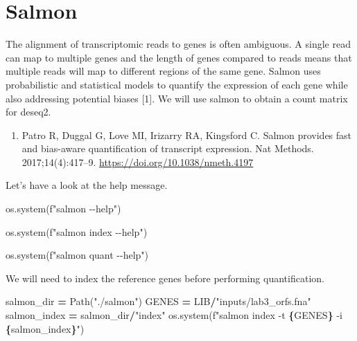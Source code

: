 \documentclass[
]{book}
\newenvironment{Shaded}{\begin{snugshade}}{\end{snugshade}}
\newcommand{\NormalTok}[1]{#1}
\newcommand{\OperatorTok}[1]{\textcolor[rgb]{0.81,0.36,0.00}{\textbf{#1}}}
\newcommand{\SpecialCharTok}[1]{\textcolor[rgb]{0.81,0.36,0.00}{\textbf{#1}}}
\newcommand{\SpecialStringTok}[1]{\textcolor[rgb]{0.31,0.60,0.02}{#1}}
\newcommand{\StringTok}[1]{\textcolor[rgb]{0.31,0.60,0.02}{#1}}
\providecommand{\tightlist}{%
  \setlength{\itemsep}{0pt}\setlength{\parskip}{0pt}}
\begin{document}
\section{Salmon}\label{salmon}

The alignment of transcriptomic reads to genes is often ambiguous. A single read can map to multiple genes and the length of genes compared to reads
means that multiple reads will map to different regions of the same gene. Salmon uses probabilistic and statistical models to quantify the expression of
each gene while also addressing potential biases {[}1{]}. We will use salmon to obtain a count matrix for deseq2.

\begin{enumerate}
\def\labelenumi{\arabic{enumi}.}
\tightlist
\item
  Patro R, Duggal G, Love MI, Irizarry RA, Kingsford C. Salmon provides fast and bias-aware quantification of transcript expression. Nat Methods. 2017;14(4):417--9. \url{https://doi.org/10.1038/nmeth.4197}
\end{enumerate}

Let's have a look at the help message.

\begin{Shaded}
\begin{Highlighting}[numbers=left,,]
\NormalTok{os.system(}\SpecialStringTok{f"salmon {-}{-}help"}\NormalTok{)}
\end{Highlighting}
\end{Shaded}

\begin{Shaded}
\begin{Highlighting}[numbers=left,,]
\NormalTok{os.system(}\SpecialStringTok{f"salmon index {-}{-}help"}\NormalTok{)}
\end{Highlighting}
\end{Shaded}

\begin{Shaded}
\begin{Highlighting}[numbers=left,,]
\NormalTok{os.system(}\SpecialStringTok{f"salmon quant {-}{-}help"}\NormalTok{)}
\end{Highlighting}
\end{Shaded}

We will need to index the reference genes before performing quantification.

\begin{Shaded}
\begin{Highlighting}[numbers=left,,]
\NormalTok{salmon\_dir }\OperatorTok{=}\NormalTok{ Path(}\StringTok{"./salmon"}\NormalTok{)}
\NormalTok{GENES }\OperatorTok{=}\NormalTok{ LIB}\OperatorTok{/}\StringTok{"inputs/lab3\_orfs.fna"}
\NormalTok{salmon\_index }\OperatorTok{=}\NormalTok{ salmon\_dir}\OperatorTok{/}\StringTok{"index"}
\NormalTok{os.system(}\SpecialStringTok{f"salmon index {-}t }\SpecialCharTok{\{}\NormalTok{GENES}\SpecialCharTok{\}}\SpecialStringTok{ {-}i }\SpecialCharTok{\{}\NormalTok{salmon\_index}\SpecialCharTok{\}}\SpecialStringTok{"}\NormalTok{)}
\end{Highlighting}
\end{Shaded}
\end{document}
